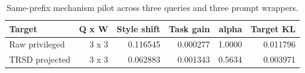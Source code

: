 \begin{table}[t]
\centering
\small
\caption{Same-prefix mechanism pilot across three queries and three prompt wrappers.}
\label{tab:trsd-same-prefix}
\begin{tabular}{lrrrrr}
\toprule
Target & Q x W & Style shift & Task gain & alpha & Target KL \\
\midrule
Raw privileged & 3 x 3 & 0.116545 & 0.000277 & 1.0000 & 0.011796 \\
TRSD projected & 3 x 3 & 0.062883 & 0.001343 & 0.5634 & 0.003971 \\
\bottomrule
\end{tabular}
\end{table}
